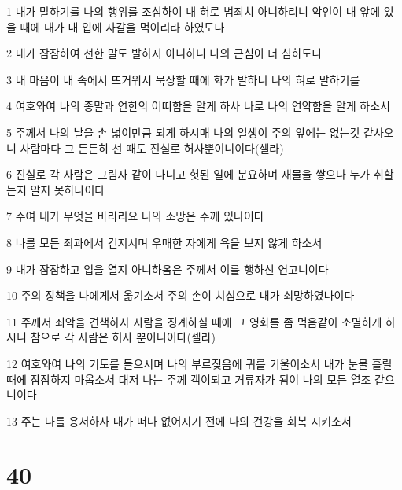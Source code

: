 \par 1 내가 말하기를 나의 행위를 조심하여 내 혀로 범죄치 아니하리니 악인이 내 앞에 있을 때에 내가 내 입에 자갈을 먹이리라 하였도다
\par 2 내가 잠잠하여 선한 말도 발하지 아니하니 나의 근심이 더 심하도다
\par 3 내 마음이 내 속에서 뜨거워서 묵상할 때에 화가 발하니 나의 혀로 말하기를
\par 4 여호와여 나의 종말과 연한의 어떠함을 알게 하사 나로 나의 연약함을 알게 하소서
\par 5 주께서 나의 날을 손 넓이만큼 되게 하시매 나의 일생이 주의 앞에는 없는것 같사오니 사람마다 그 든든히 선 때도 진실로 허사뿐이니이다(셀라)
\par 6 진실로 각 사람은 그림자 같이 다니고 헛된 일에 분요하며 재물을 쌓으나 누가 취할는지 알지 못하나이다
\par 7 주여 내가 무엇을 바라리요 나의 소망은 주께 있나이다
\par 8 나를 모든 죄과에서 건지시며 우매한 자에게 욕을 보지 않게 하소서
\par 9 내가 잠잠하고 입을 열지 아니하옴은 주께서 이를 행하신 연고니이다
\par 10 주의 징책을 나에게서 옮기소서 주의 손이 치심으로 내가 쇠망하였나이다
\par 11 주께서 죄악을 견책하사 사람을 징계하실 때에 그 영화를 좀 먹음같이 소멸하게 하시니 참으로 각 사람은 허사 뿐이니이다(셀라)
\par 12 여호와여 나의 기도를 들으시며 나의 부르짖음에 귀를 기울이소서 내가 눈물 흘릴 때에 잠잠하지 마옵소서 대저 나는 주께 객이되고 거류자가 됨이 나의 모든 열조 같으니이다
\par 13 주는 나를 용서하사 내가 떠나 없어지기 전에 나의 건강을 회복 시키소서

\chapter{40}

